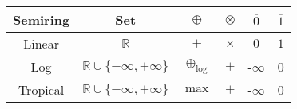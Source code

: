 \begingroup\centering
\begin{tabular}{c||c|c|c|c|c}
Semiring & Set & $\oplus$ & $\otimes$ & $\overline{0}$ & $\overline{1}$\\
\hline\hline
Linear   & $ \mathbb{R}$ & $+$ & $\times$ & $0$ & $1$\\
Log      & $ \mathbb{R} \cup \{ -\infty, +\infty \}$ & $\oplus_{\log}$ & $+$ & -$\infty$ & 0\\
Tropical & $ \mathbb{R} \cup \{ -\infty, +\infty \}$ & $\max$ & $+$ & -$\infty$ & 0\\
\end{tabular}
\par\endgroup